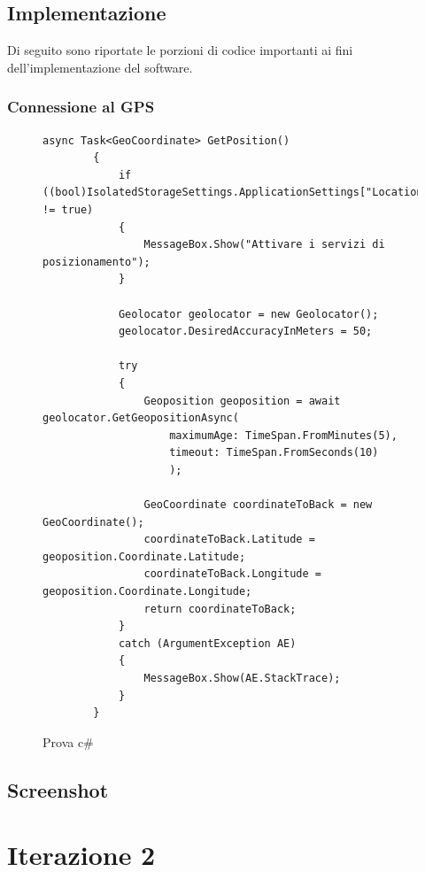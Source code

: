 \subsection{Implementazione}
Di seguito sono riportate le porzioni di codice importanti ai fini dell'implementazione del software.
\subsubsection{Connessione al GPS}
\begin{figure}
\begin{center}
\lstset{language=CSharp}
\begin{lstlisting}
async Task<GeoCoordinate> GetPosition()
        {
            if ((bool)IsolatedStorageSettings.ApplicationSettings["LocationConsent"] != true)
            {
                MessageBox.Show("Attivare i servizi di posizionamento");
            }

            Geolocator geolocator = new Geolocator();
            geolocator.DesiredAccuracyInMeters = 50;

            try
            {
                Geoposition geoposition = await geolocator.GetGeopositionAsync(
                    maximumAge: TimeSpan.FromMinutes(5),
                    timeout: TimeSpan.FromSeconds(10)
                    );

                GeoCoordinate coordinateToBack = new GeoCoordinate();
                coordinateToBack.Latitude = geoposition.Coordinate.Latitude;
                coordinateToBack.Longitude = geoposition.Coordinate.Longitude;
                return coordinateToBack;
            }
            catch (ArgumentException AE)
            {
                MessageBox.Show(AE.StackTrace);
            }
        }
\end{lstlisting}
\caption{Prova c\#\label{c}}
\end{center}
\end{figure}


\subsection{Screenshot}





\clearpage

\section{Iterazione 2}

